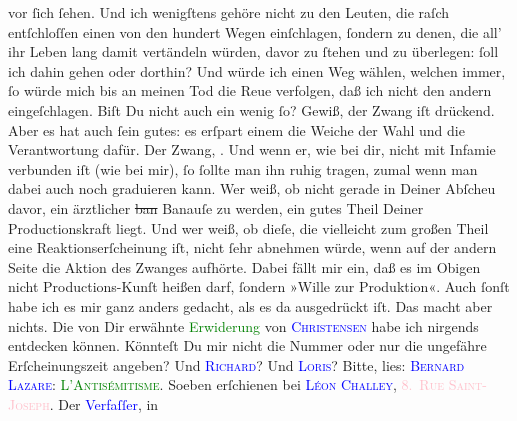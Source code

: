 \documentclass[twoside=false,titlepage=false,open=any, parskip=never, fontsize=12pt, headings=small, chapterprefix=false, appendixprefix=false]{scrbook}
\newcommand{\strikeout}[1]{\sout{#1}}
\newcommand{\pbposition}{\depth}
\newcommand{\pb}{\nobreak\hspace{0pt}\raisebox{-0.1em}{\raisebox{\pbposition}{\textnormal{|}}}\nobreak\hspace{0pt}}
\begin{document}
               vor ſich ſehen. Und ich wenigſtens gehöre nicht zu den Leuten, die raſch entſchloſſen
               einen von den hundert Wegen einſchlagen, ſondern zu denen, die all’ ihr Leben lang
               damit vertändeln würden, davor zu ſtehen {\pb}und zu
               überlegen: ſoll ich dahin gehen oder dorthin? Und würde ich einen Weg wählen, welchen
               immer, ſo würde mich bis an meinen Tod die Reue verfolgen, daß ich nicht den andern
               eingeſchlagen. Biſt Du nicht auch ein wenig ſo? Gewiß, der Zwang iſt drückend. Aber
               es hat auch ſein gutes: es erſpart einem die Weiche der Wahl und die Verantwortung
               dafür. Der Zwang, \label{K_L02621-3v}\label{K_L02621-3h}. Und wenn er, wie bei dir, nicht mit Infamie verbunden iſt (wie
               bei mir), ſo ſollte man ihn {\pb}ruhig tragen, zumal
               wenn man dabei auch noch graduieren kann. Wer weiß, ob nicht gerade in Deiner Abſcheu
               davor, ein ärztlicher \strikeout{ban} Banauſe zu werden, ein
               gutes Theil Deiner Productionskraft liegt. Und wer weiß, ob dieſe, die vielleicht zum
               großen Theil eine Reaktionserſcheinung iſt, nicht ſehr abnehmen würde, wenn auf der
               andern Seite die Aktion des Zwanges aufhörte. Dabei fällt mir ein, daß es im Obigen
               nicht Productions-Kunſt heißen darf, ſondern »Wille zur Produktion«. Auch ſonſt habe
               ich es mir ganz {\pb}anders gedacht, als es da
               ausgedrückt iſt. Das macht aber nichts.\pend
           \pstart
           Die von Dir erwähnte \textcolor{green}{Erwiderung}{} von \textsc{\textcolor{blue}{Christensen}{}\ledrightnote{\textcolor{blue}{Hjalmar Christensen}}} habe ich nirgends entdecken können. Könnteſt Du mir nicht die Nummer oder nur
               die ungefähre Erſcheinungszeit angeben?\pend
           \pstart
           Und \textsc{\textcolor{blue}{Richard}{}\ledrightnote{\textcolor{blue}{Richard Beer-Hofmann}}}? Und \textsc{\textcolor{blue}{Loris}{}\ledrightnote{\textcolor{blue}{Hugo von Hofmannsthal}}}?\pend
           \pstart
           Bitte, lies: \textsc{\textcolor{blue}{Bernard Lazare}{}\ledrightnote{\textcolor{blue}{Bernard Lazare}}}: \textsc{\textcolor{green}{L’Antisémitisme}{}\ledrightnote{\textcolor{green}{L’antisémitisme. Son histoire et ses causes}}}. Soeben erſchienen bei \textsc{\textcolor{blue}{Léon Challey}{}\ledrightnote{\textcolor{blue}{Léon Chailley}}}, \textsc{\textcolor{pink}{8. Rue Saint-Joseph}{}\ledrightnote{\textcolor{pink}{Rue Saint-Joseph}}}. Der \textcolor{blue}{Verfaſſer}{}, in
\end{document}
